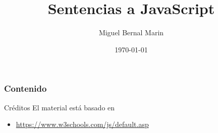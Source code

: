 \documentclass[aspectratio=169]{beamer}
\title{Sentencias a JavaScript} %
\author{Miguel Bernal Marin} %
\institute[Escuela] %
{
 Nombre de la Institución\\%
\medskip
\textit{correo} %
}
\date{
    \today
} %
\begin{document}
\begin{frame}
    \titlepage
\end{frame}

\begin{frame}
    \frametitle{Contenido}
    \tableofcontents
\end{frame}



\begin{frame}[c]{Créditos}
  El material está basado en
  \begin{itemize}
    \item \href{https://www.w3schools.com/js/default.asp}{https://www.w3schools.com/js/default.asp}
  \end{itemize}
\end{frame}
\end{document}
